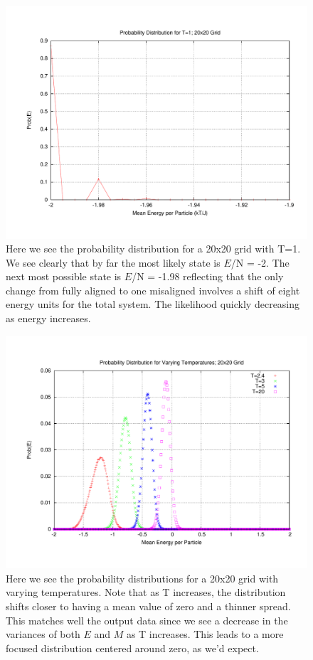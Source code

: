 \documentclass[11pt,a4paper]{article}
\begin{document}
\begin{figure}
\centering
\includegraphics[width=1.0\textwidth]{prob_T1.pdf}
\caption{Here we see the probability distribution for a 20x20 grid with T=1. We see clearly that by far the most likely state is $E$/N = -2. The next most possible state is $E$/N = -1.98 reflecting that the only change from fully aligned to one misaligned involves a shift of eight energy units for the total system. The likelihood quickly decreasing as energy increases.}
\end{figure}
\begin{figure}
\centering
\includegraphics[width=1.0\textwidth]{prob_vT.pdf}
\caption{Here we see the probability distributions for a 20x20 grid with varying temperatures. Note that as T increases, the distribution shifts closer to having a mean value of zero and a thinner spread. This matches well the output data since we see a decrease in the variances of both $E$ and $M$ as T increases. This leads to a more focused distribution centered around zero, as we'd expect.}
\end{figure}
\end{document}
